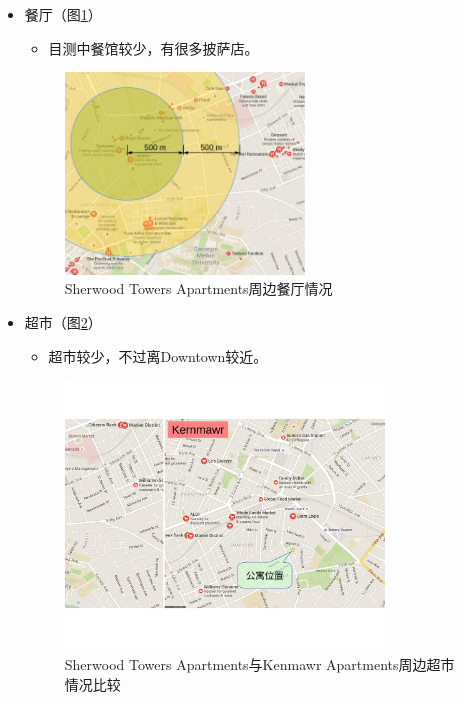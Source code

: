 \documentclass[nofonts,a4paper,11pt]{article}
\begin{document}
\begin{itemize}
	\item 餐厅（图\ref{fig:food}）
	\begin{itemize}
		\item 目测中餐馆较少，有很多披萨店。
	\end{itemize}
	\begin{figure}[!htb]
		\centering
		\includegraphics[width=0.6\textwidth]{./img/food}
		\caption{Sherwood Towers Apartments周边餐厅情况}
		\label{fig:food}
	\end{figure}
	\item 超市（图\ref{fig:supermarket}）
	\begin{itemize}
		\item 超市较少，不过离Downtown较近。
	\end{itemize}
	\begin{figure}[!htb]
		\centering
		\includegraphics[width=0.8\textwidth]{./img/supermarket}
		\caption{Sherwood Towers Apartments与Kenmawr Apartments周边超市情况比较}
		\label{fig:supermarket}
	\end{figure}		
\end{itemize}
\end{document}
